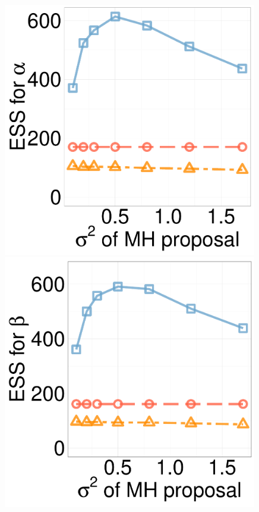 \begin{figure}[H]
\begin{minipage}[hp]{0.24\linewidth}
	\end{minipage}
  \centering
  \begin{minipage}[!hp]{0.24\linewidth}
  \centering
    \includegraphics [width=0.99\textwidth, angle=0]{figs/ess/QC_D3alpha_k2.pdf}
\end{minipage}
  \begin{minipage}[hp]{0.24\linewidth}
  \centering
    \includegraphics [width=0.99\textwidth, angle=0]{figs/ess/QC_D3beta_k2.pdf}

\end{minipage}
\end{figure}
